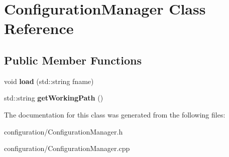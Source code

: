 \hypertarget{classConfigurationManager}{}\section{Configuration\+Manager Class Reference}
\label{classConfigurationManager}
\subsection*{Public Member Functions}
\begin{DoxyCompactItemize}
\item 
void {\bfseries load} (std\+::string fname)\hypertarget{classConfigurationManager_a066a7ae7e01b7ba6b62782fd3eeffaab}{}\label{classConfigurationManager_a066a7ae7e01b7ba6b62782fd3eeffaab}

\item 
std\+::string {\bfseries get\+Working\+Path} ()\hypertarget{classConfigurationManager_ab4fac4121f154fb83b67a727b650c436}{}\label{classConfigurationManager_ab4fac4121f154fb83b67a727b650c436}

\end{DoxyCompactItemize}


The documentation for this class was generated from the following files\+:\begin{DoxyCompactItemize}
\item 
configuration/Configuration\+Manager.\+h\item 
configuration/Configuration\+Manager.\+cpp\end{DoxyCompactItemize}
